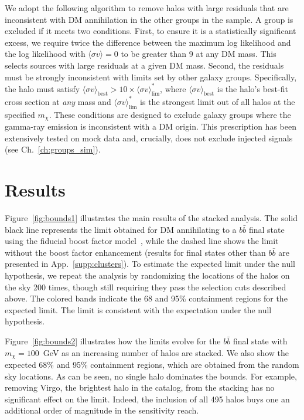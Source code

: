 We adopt the following algorithm to remove halos with large residuals that are inconsistent with DM annihilation in the other groups in the sample. A group is excluded if it meets two conditions. First, to ensure it is a statistically significant excess, we require twice the difference between the maximum log likelihood and the log likelihood with $\langle \sigma v \rangle = 0$ to be greater than 9 at any DM mass. This selects sources with large residuals at a given DM mass.  Second, the residuals must be strongly inconsistent with limits set by other galaxy groups. Specifically, the halo  must satisfy $\langle\sigma v\rangle_\text{best} > 10 \times \langle\sigma v\rangle^*_\text{lim}$, where $\langle\sigma v\rangle_\text{best}$ is the halo's best-fit cross section at \emph{any} mass and $\langle\sigma v\rangle^*_\text{lim}$ is the strongest limit out of all halos at the specified $m_\chi$. These conditions are designed to exclude galaxy groups where the gamma-ray emission is inconsistent with a DM origin.  This prescription has been extensively tested on mock data and, crucially, does not exclude injected signals (see Ch.~\ref{ch:groups_sim}).

\section{Results}

Figure~\ref{fig:bounds1} illustrates the main results of the stacked analysis.  The solid black line represents the limit obtained for DM annihilating to a $b \bar b$ final state using the fiducial boost factor model~\cite{Bartels:2015uba}, while the dashed line  shows the limit without the boost factor enhancement (results for final states other than $b\bar b$ are presented in App.~\ref{supp:clusters}).  To estimate the expected limit under the null hypothesis, we repeat the analysis by randomizing the locations of the halos on the sky 200 times, though still requiring they pass the selection cuts described above.  
The colored bands indicate the 68 and 95\% containment regions for the expected limit.  
The limit is consistent with the expectation under the null hypothesis.

Figure~\ref{fig:bounds2} illustrates how the limits evolve for the $b \bar b$ final state with $m_\chi = 100$~GeV as an increasing number of halos are stacked.  We also show the expected 68\% and 95\% containment regions, which are obtained from the random sky locations.  As can be seen, no single halo dominates the bounds.  For example, removing Virgo, the brightest halo in the catalog, from the stacking has no significant effect on the limit.  Indeed, the inclusion of all 495 halos buys one an additional order of magnitude in the sensitivity reach.

